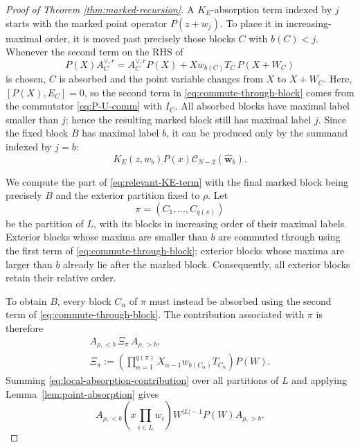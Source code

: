 \documentclass[letterpaper,12pt]{amsart}
\theoremstyle{definition}
\newcommand{\scrC}{\mathscr C}
\numberwithin{equation}{section}
\begin{document}
\begin{proof}[Proof of Theorem \ref{thm:marked-recursion}]
A \(K_E\)-absorption term indexed by \(j\) starts with the marked point
operator \(P(z+w_j)\).  To place it in increasing-maximal order, it is moved
past precisely those blocks \(C\) with \(b(C)<j\).  Whenever the second term on the RHS
of 
\begin{equation}
  P(X)A_C^{\vee,r}
  =
  A_C^{\vee,r}P(X)
  {}+Xw_{b(C)}T_C\,P(X+W_C)
  \label{eq:commute-through-block}
\end{equation}
is chosen, \(C\) is absorbed and the point
variable changes from \(X\) to \(X+W_C\). Here, \([P(X),E_C]=0\), so the second term in
\eqref{eq:commute-through-block} comes from the commutator \eqref{eq:P-U-comm} with \(I_C\). All absorbed blocks have maximal
label smaller than \(j\); hence the resulting marked block still has maximal
label \(j\).  Since the fixed block \(B\) has maximal label \(b\), it can be
produced only by the summand indexed by \(j=b\):
\begin{equation}
  K_E(z,w_b)P(x)
  \scrC_{N-2}(\widehat{\boldsymbol w}_b).
  \label{eq:relevant-KE-term}
\end{equation}

We compute the part of \eqref{eq:relevant-KE-term} with the final marked block being precisely \(B\) and the exterior partition fixed to \(\rho\). Let
\[
  \pi=(C_1,\ldots,C_{q(\pi)})
\]
be the partition of \(L\), with its blocks in increasing order of their
maximal labels.  Exterior blocks whose maxima are smaller than \(b\) are
commuted through using the first term of \eqref{eq:commute-through-block}; exterior
blocks whose maxima are larger than \(b\) already lie after the marked block.
Consequently, all exterior blocks retain their relative order.

To obtain \(B\), every block \(C_\alpha\) of \(\pi\) must instead be absorbed
using the second term of \eqref{eq:commute-through-block}.  
The contribution associated with \(\pi\) is therefore
\begin{equation}
  \begin{gathered}
    A_{\rho,<b}\,\Xi_\pi\,A_{\rho,>b},\\
    \Xi_\pi
    :=
    \left(
      \prod_{\alpha=1}^{q(\pi)}
      X_{\alpha-1}w_{b(C_\alpha)}T_{C_\alpha}
    \right)P(W).
  \end{gathered}
  \label{eq:local-absorption-contribution}
\end{equation}
Summing
\eqref{eq:local-absorption-contribution} over all partitions of \(L\) and
applying Lemma~\ref{lem:point-absorption} gives
\begin{equation}
  A_{\rho,<b}
  \left(x\prod_{i\in L}w_i\right)W^{|L|-1}P(W)
  A_{\rho,>b}.
  \label{eq:absorbed-point-sum}
\end{equation}



\end{proof}
\end{document}
